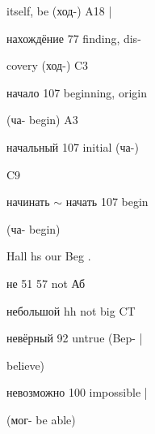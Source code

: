 \begin{minipage}[t]{0.475\textwidth}
\noindent itself, be (ход-) A18 |\par
\noindent нахождёние 77 finding, dis-\par
\noindent covery (ход-) C3\par
\noindent начало 107 beginning, origin\par
\noindent (ча- begin) A3\par
\noindent начальный 107 initial (ча-)\par
\noindent C9\par
\noindent начинать $\sim$ начать 107 begin\par
\noindent (ча- begin)\par
\noindent Hall hs our Beg .\par
\noindent не 51 57 not Аб\par
\noindent небольшой hh not big CT\par
\noindent невёрный 92 untrue (Bep- |\par
\noindent believe)\par
\noindent невозможно 100 impossible |\par
\noindent (мог- be able)\par
\end{minipage}\hfill
